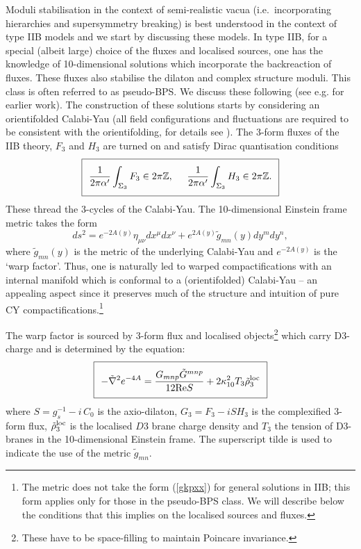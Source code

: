 Moduli stabilisation in the context of semi-realistic vacua (i.e.~incorporating hierarchies and supersymmetry breaking) is best understood in the context of type IIB models and we start by discussing these models. In type IIB, for a special (albeit large) choice of the fluxes and localised sources,
one has  the knowledge of 10-dimensional solutions which incorporate the backreaction of fluxes. These fluxes also stabilise the dilaton and complex structure moduli.  This class is often referred to as pseudo-BPS. We discuss these  following \cite{Giddings:2001yu, Dasgupta:1999ss, Gukov:1999ya} (see  e.g.  \cite{hep-th/0012213, Taylor:1999ii, Michelson:1996pn} for earlier work).  The construction of these solutions starts by considering an orientifolded Calabi-Yau (all field configurations and fluctuations are required to be consistent with the orientifolding, for details see \cite{Grimm:2004uq}). The
3-form fluxes of the IIB theory, $F_3$ and $H_3$ are turned on and satisfy Dirac quantisation conditions
\begin{equation}
\setlength\fboxsep{0.25cm}
\setlength\fboxrule{0.4pt}
\boxed{
\label{fluxquanta}
{1 \over 2 \pi \alpha'}  \int_{\Sigma_{3}} F_3 \in 2 \pi \mathbb{Z},  \phantom{abc} {1 \over 2 \pi \alpha'}  \int_{\Sigma_{3}} H_3 \in 2 \pi \mathbb{Z}.
}
\end{equation}
These thread the 3-cycles of the Calabi-Yau. The 10-dimensional Einstein frame metric takes the form
\begin{equation}
\label{gkpxx}
  ds^2 = e^{-2A(y)} \eta_{\mu \nu} dx^{\mu} dx^{\nu} + e^{2A(y)} \tilde{g}_{mn}(y) dy^{m} dy^{n},
\end{equation}
where $\tilde{g}_{mn}(y)$ is the metric of the underlying Calabi-Yau  and $e^{-2A(y)}$ is the `warp factor'. Thus, one is naturally
led to warped compactifications with an internal manifold which is conformal to a (orientifolded) Calabi-Yau -- an appealing aspect since it preserves
much of the structure and intuition of pure CY compactifications.\footnote{The metric does not take the form (\ref{gkpxx}) for general solutions in IIB; this form applies only for those in the pseudo-BPS class. We will describe below the conditions that this implies on the localised sources and fluxes.}

The warp factor is sourced by 3-form flux and localised objects\footnote{These have to be space-filling to maintain Poincare invariance.
} which carry D3-charge and is determined by the equation:
\begin{equation} 
\label{warpf}
\setlength\fboxsep{0.25cm}
\setlength\fboxrule{0.4pt}
\boxed{
 -  \tilde{ \nabla}^{2} e^{-4A} =   { G_{mnp} \tilde{G}^{mnp}  \over {12 {\rm{Re }} S} } + 2 \kappa_{10}^2 T_{3} \tilde{\rho}^{\rm loc}_3
 }
\end{equation}
where $S =  g_s^{-1} - i\,C_0$ is the axio-dilaton, $G_{3} = F_3 - iS H_3$ is the complexified 3-form flux, $\tilde{\rho}^{\rm loc}_{3}$
is the localised $D3$ brane charge density and $T_3$ the tension of D3-branes in the 10-dimensional Einstein frame. The superscript
tilde is used to indicate the use of the metric $\tilde{g}_{mn}$.

